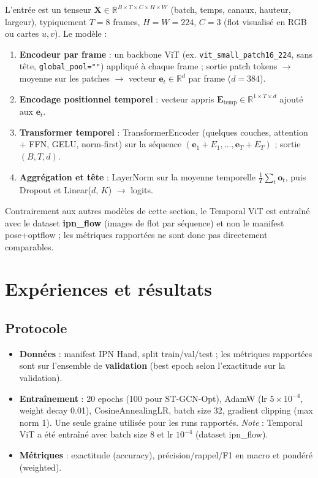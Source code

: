 \documentclass[11pt,a4paper]{article}
\begin{document}
L'entrée est un tenseur $\mathbf{X} \in \mathbb{R}^{B \times T \times C \times H \times W}$ (batch, temps, canaux, hauteur, largeur), typiquement $T=8$ frames, $H=W=224$, $C=3$ (flot visualisé en RGB ou cartes $u,v$). Le modèle :
\begin{enumerate}
  \item \textbf{Encodeur par frame} : un backbone ViT (ex. \texttt{vit\_small\_patch16\_224}, sans tête, \texttt{global\_pool=""}) appliqué à chaque frame ; sortie patch tokens $\to$ moyenne sur les patches $\to$ vecteur $\mathbf{e}_t \in \mathbb{R}^{d}$ par frame ($d=384$).
  \item \textbf{Encodage positionnel temporel} : vecteur appris $\mathbf{E}_{\mathrm{temp}} \in \mathbb{R}^{1 \times T \times d}$ ajouté aux $\mathbf{e}_t$.
  \item \textbf{Transformer temporel} : TransformerEncoder (quelques couches, attention + FFN, GELU, norm-first) sur la séquence $(\mathbf{e}_1 + E_{1}, \ldots, \mathbf{e}_T + E_T)$ ; sortie $(B, T, d)$.
  \item \textbf{Aggrégation et tête} : LayerNorm sur la moyenne temporelle $\frac{1}{T}\sum_t \mathbf{o}_t$, puis Dropout et Linear($d$, $K$) $\to$ logits.
\end{enumerate}
Contrairement aux autres modèles de cette section, le Temporal ViT est entraîné avec le dataset \textbf{ipn\_flow} (images de flot par séquence) et non le manifest pose+optflow ; les métriques rapportées ne sont donc pas directement comparables.

\section{Expériences et résultats}
\label{sec:experiments}

\subsection{Protocole}

\begin{itemize}
  \item \textbf{Données} : manifest IPN Hand, split train/val/test ; les métriques rapportées sont sur l’ensemble de \textbf{validation} (best epoch selon l’exactitude sur la validation).
  \item \textbf{Entraînement} : 20 epochs (100 pour ST-GCN-Opt), AdamW (lr $5\times10^{-4}$, weight decay 0.01), CosineAnnealingLR, batch size 32, gradient clipping (max norm 1). Une seule graine utilisée pour les runs rapportés. \emph{Note} : Temporal ViT a été entraîné avec batch size 8 et lr $10^{-4}$ (dataset ipn\_flow).
  \item \textbf{Métriques} : exactitude (accuracy), précision/rappel/F1 en macro et pondéré (weighted).
\end{itemize}
\end{document}
